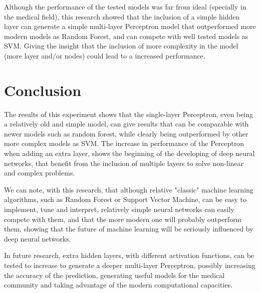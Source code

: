 \documentclass[10pt,twocolumn,letterpaper]{article}
\begin{document}
Although the performance of the tested models was far from ideal (specially in the medical field), this research showed that the inclusion of a simple hidden layer can generate a simple multi-layer Perceptron model that outperformed more modern models as Random Forest, and can compete with well tested models as SVM. Giving the insight that the inclusion of more complexity in the model (more layer and/or nodes) could lead to a increased performance.


\section{Conclusion}

The results of this experiment shows that the single-layer Perceptron, even being a relatively old and simple model, can give results that can be comparable with newer models such as random forest, while clearly being outperformed by other more complex models as SVM. The increase in performance of the Perceptron when adding an extra layer, shows the beginning of the developing of deep neural networks, that benefit from the inclusion of multiple layers to solve non-linear and complex problems.

We can note, with this research, that although relative "classic" machine learning algorithms, such as Random Forest or Support Vector Machine, can be easy to implement, tune and interpret, relatively simple neural networks can easily compete with them, and that the more modern one will probably outperform them, showing that the future of machine learning will be seriously influenced by deep neural networks.

In future research, extra hidden layers, with different activation functions, can be tested to increase to generate a deeper multi-layer Perceptron, possibly increasing the  accuracy of the prediction, generating useful models for the medical community and taking advantage of the modern computational capacities.


{\small


}
\end{document}
